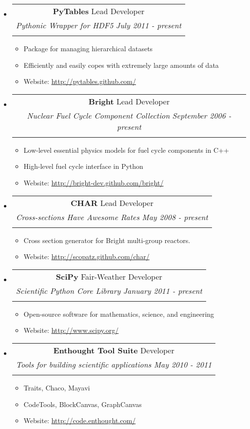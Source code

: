 \documentclass[letterpaper,11pt]{article}
\makeatletter
\newcommand{\resitem}[1]{\item #1 \vspace{-2pt}}
\newcommand{\ressubheading}[4]{
\begin{center}
\begin{tabular*}{6.5in}{l@{\extracolsep{\fill}}r}
    \multicolumn{2}{c}{\textbf{#1} \cftdotfill{\cftdotsep} #2} \\
    \multicolumn{2}{c}{\textit{#3} \cftdotfill{\cftdotsep} \textit{#4}} \\
    \vphantom{E}
\end{tabular*}
\end{center}
\vspace{-24pt}
}
\makeatother
\begin{document}
\begin{itemize}
\item
    \ressubheading{PyTables}{Lead Developer}{Pythonic Wrapper for HDF5}
                  {July 2011 - present}
    \begin{itemize}
        \resitem{Package for managing hierarchical datasets}
        \resitem{Efficiently and easily copes with extremely large amounts of data}
        \resitem{Website: \url{http://pytables.github.com/}}
    \end{itemize}

\item
    \ressubheading{Bright}{Lead Developer}{Nuclear Fuel Cycle Component Collection}
                  {September 2006 - present}
    \begin{itemize}
        \resitem{Low-level essential physics models for fuel cycle components in C++}
        \resitem{High-level fuel cycle interface in Python}
        \resitem{Website: \url{http://bright-dev.github.com/bright/}}
    \end{itemize}

\item
    \ressubheading{CHAR}{Lead Developer}{Cross-sections Have Awesome Rates}
                  {May 2008 - present}
    \begin{itemize}
        \resitem{Cross section generator for Bright multi-group reactors.}
        \resitem{Website: \url{http://scopatz.github.com/char/}}
    \end{itemize}

\item
    \ressubheading{SciPy}{Fair-Weather Developer}{Scientific Python Core Library}
                  {January 2011 - present}
    \begin{itemize}
        \resitem{Open-source software for mathematics, science, and engineering}
        \resitem{Website: \url{http://www.scipy.org/}}
    \end{itemize}

\item
    \ressubheading{Enthought Tool Suite}{Developer}
                  {Tools for building scientific applications}{May 2010 - 2011}
    \begin{itemize}
        \resitem{Traits, Chaco, Mayavi}
        \resitem{CodeTools, BlockCanvas, GraphCanvas}
        \resitem{Website: \url{http://code.enthought.com/}}
    \end{itemize}

\end{itemize}
\end{document}
